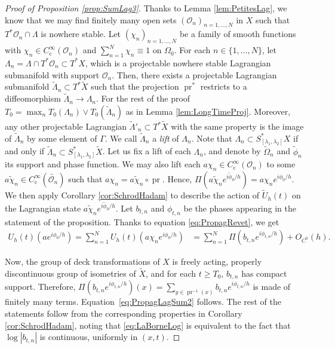 \documentclass[10pt]{amsart}
\let\mathcal\mathscr
\newcommand{\rc}{\mathrm{c}}
\theoremstyle{plain}
\theoremstyle{definition}
\DeclareMathOperator{\pr}{pr}
\begin{document}
\begin{proof}[Proof of Proposition \ref{prop:SumLag3}]
Thanks to Lemma \ref{lem:PetitesLag}, we know that we may find finitely many open sets $(\mathcal{O}_n)_{n=1,\dots,N}$ in $X$ such that $T^*\mathcal{O}_n\cap \Lambda$ is nowhere stable. Let $(\chi_n)_{n=1,\dots,N}$ be a family of smooth functions with $\chi_n\in C_\rc^\infty(\mathcal{O}_n)$ and $\sum_{n=1}^N \chi_n \equiv 1$ on $\Omega_0$. For each $n\in \{1,\dots,N\}$, let $\Lambda_n = \Lambda\cap T^*\mathcal{O}_n\subset T^*X$, which is a projectable nowhere stable Lagrangian submanifold with support $\mathcal{O}_n$. Then, there exists a projectable Lagrangian submanifold $\widetilde{\Lambda}_n\subset T^*\tilde{X}$ such that the projection $\pr^*$ restricts to a diffeomorphism $\widetilde{\Lambda}_n\to\Lambda_n$. For the rest of the proof $T_0=\max_n T_0(\Lambda_n)\vee T_0(\tilde{\Lambda}_n)$ as in Lemma \ref{lem:LongTimeProj}. Moreover, any other projectable Lagrangian $\widetilde{\Lambda}'_n\subset T^*\tilde{X}$ with the same property is the image of $\widetilde{\Lambda}_n$ by some element of $\Gamma$. We call $\widetilde{\Lambda}_n$ a \emph{lift} of $\Lambda_n$. Note that $\Lambda_n\subset S_{[\lambda_1,\lambda_2]}^*X$ if and only if $\widetilde{\Lambda}_n\subset S_{[\lambda_1,\lambda_2]}^*\tilde{X}$. Let us fix a lift of each $\Lambda_n$, and denote by $\widetilde{\Omega}_n$ and $\widetilde{\phi}_n$ its support and phase function. We may also lift each $a\chi_n\in C_\rc^\infty(\mathcal{O}_n)$ to some $\widetilde{a\chi_n}\in C_\rc^\infty(\widetilde{\mathcal{O}_n})$ such that $a\chi_n= \widetilde{a\chi_n}\circ \pr$. Hence, $\Pi(\widetilde{a\chi_n} e^{i\widetilde{\phi}_0/h}) = a\chi_n e^{i\phi_0/h}$. We then apply Corollary \ref{cor:SchrodHadam} to describe the action of $\tilde{U}_h(t)$ on the Lagrangian state $\widetilde{a\chi_n}e^{i\widetilde{\phi}_0/h}$. Let $b_{t,n}$ and $\phi_{t,n}$ be the phases appearing in the statement of the proposition. Thanks to equation \eqref{eq:PropagRevet}, we get
\begin{align*}
U_h(t)(a e^{i\phi_0/h}) = \sum_{n=1}^N U_h(t)(a\chi_n e^{i\phi_0/h}) &= \sum_{n=1}^N \Pi(b_{t,n} e^{i\phi_{t,n}/h}) +O_{C^0}(h).
\end{align*}

Now, the group of deck transformations of $X$ is freely acting, properly discontinuous group of isometries of $\tilde{X}$, and for each $t\geq T_0$, $b_{t,n}$ has compact support. Therefore, $\Pi (b_{t,n} e^{i\phi_{t,n}/h})(x) = \sum_{y\in \pr^{-1}(x)} b_{t,n} e^{i\phi_{t,n}/h} $ is made of finitely many terms. Equation~\eqref{eq:PropagLagSum2} follows. The rest of the statements follow from the corresponding properties in Corollary \ref{cor:SchrodHadam}, noting that \eqref{eq:LaBorneLog} is equivalent to the fact that $\log |b_{t,n}|$ is continuous, uniformly in $(x,t)$.


\end{proof}
\end{document}
